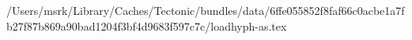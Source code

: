/Users/msrk/Library/Caches/Tectonic/bundles/data/6ffe055852f8faf66c0acbe1a7fb27f87b869a90bad1204f3bf4d9683f597c7c/loadhyph-as.tex